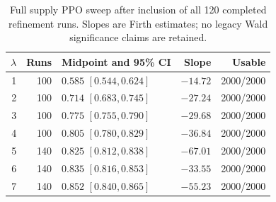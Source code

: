\begin{table}[t]
\caption{Full supply PPO sweep after inclusion of all 120 completed refinement runs. Slopes are Firth estimates; no legacy Wald significance claims are retained.}
\label{tab:lambda_sweep}
\centering\small
\begin{tabular}{@{}rrlrr@{}}
\toprule
$\lambda$ & Runs & Midpoint and 95\% CI & Slope & Usable \\
\midrule
1 & 100 & $0.585$ $[0.544,0.624]$ & $-14.72$ & 2000/2000 \\
2 & 100 & $0.714$ $[0.683,0.745]$ & $-27.24$ & 2000/2000 \\
3 & 100 & $0.775$ $[0.755,0.790]$ & $-29.68$ & 2000/2000 \\
4 & 100 & $0.805$ $[0.780,0.829]$ & $-36.84$ & 2000/2000 \\
5 & 140 & $0.825$ $[0.812,0.838]$ & $-67.01$ & 2000/2000 \\
6 & 140 & $0.835$ $[0.816,0.853]$ & $-33.55$ & 2000/2000 \\
7 & 140 & $0.852$ $[0.840,0.865]$ & $-55.23$ & 2000/2000 \\
\bottomrule
\end{tabular}
\end{table}
